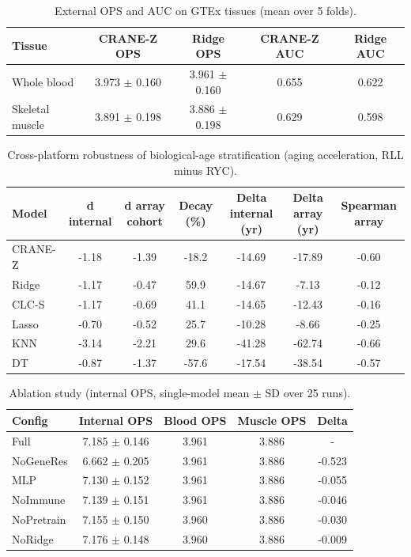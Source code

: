 \documentclass[unnumsec,webpdf,contemporary,large]{oup-authoring-template}
\begin{document}
\begin{table}[htbp]
\caption{External OPS and AUC on GTEx tissues (mean over 5 folds).}
\label{tab:external}
\begin{center}
\begin{tabular}{lcccc}
\hline
Tissue & CRANE-Z OPS & Ridge OPS & CRANE-Z AUC & Ridge AUC \\
\hline
Whole blood & 3.973 $\pm$ 0.160 & 3.961 $\pm$ 0.160 & 0.655 & 0.622 \\
Skeletal muscle & 3.891 $\pm$ 0.198 & 3.886 $\pm$ 0.198 & 0.629 & 0.598 \\
\hline
\end{tabular}
\end{center}
\end{table}

\begin{table}[htbp]
\caption{Cross-platform robustness of biological-age stratification (aging acceleration, RLL minus RYC).}
\label{tab:aa_robustness}
\begin{center}
\begin{tabular}{lcccccc}
\hline
Model & d internal & d array cohort & Decay (\%) & Delta internal (yr) & Delta array (yr) & Spearman array \\
\hline
CRANE-Z & -1.18 & -1.39 & -18.2 & -14.69 & -17.89 & -0.60 \\
Ridge & -1.17 & -0.47 & 59.9 & -14.67 & -7.13 & -0.12 \\
CLC-S & -1.17 & -0.69 & 41.1 & -14.65 & -12.43 & -0.16 \\
Lasso & -0.70 & -0.52 & 25.7 & -10.28 & -8.66 & -0.25 \\
KNN & -3.14 & -2.21 & 29.6 & -41.28 & -62.74 & -0.66 \\
DT & -0.87 & -1.37 & -57.6 & -17.54 & -38.54 & -0.57 \\
\hline
\end{tabular}
\end{center}
\end{table}

\begin{table}[htbp]
\caption{Ablation study (internal OPS, single-model mean $\pm$ SD over 25 runs).}
\label{tab:ablation}
\begin{center}
\begin{tabular}{lcccc}
\hline
Config & Internal OPS & Blood OPS & Muscle OPS & Delta \\
\hline
Full & 7.185 $\pm$ 0.146 & 3.961 & 3.886 & - \\
NoGeneRes & 6.662 $\pm$ 0.205 & 3.961 & 3.886 & -0.523 \\
MLP & 7.130 $\pm$ 0.152 & 3.961 & 3.886 & -0.055 \\
NoImmune & 7.139 $\pm$ 0.151 & 3.961 & 3.886 & -0.046 \\
NoPretrain & 7.155 $\pm$ 0.150 & 3.960 & 3.886 & -0.030 \\
NoRidge & 7.176 $\pm$ 0.148 & 3.960 & 3.886 & -0.009 \\
\hline
\end{tabular}
\end{center}
\end{table}
\end{document}
